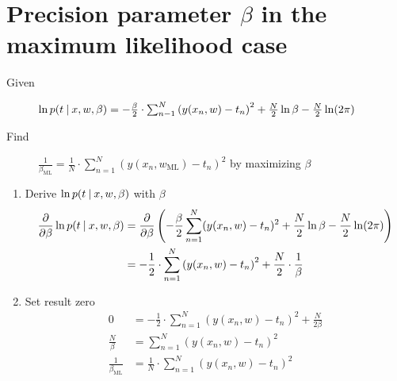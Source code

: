 \documentclass[a4paper]{article}
\newcommand\given{
  \nonscript\:
  \vert
  \nonscript\:
  \mathopen{}
  \allowbreak
}
\begin{document}
\section{Precision parameter $\beta$ in the maximum likelihood case}

\begin{description}
  \item[Given] $\ln{p(t \given x,w,\beta)} = -\frac{\beta}{2} \cdot \sum_{n-1}^N \left(y(x_n,w) - t_n\right)^2 + \frac{N}2 \ln{\beta} - \frac{N}{2} \ln(2\pi)$
  \item[Find] $\frac{1}{\beta_{\text{ML}}} = \frac{1}{N} \cdot \sum_{n=1}^N (y(x_n, w_{\text{ML}}) - t_n)^2$ by maximizing $\beta$
\end{description}

\begin{enumerate}
  \item Derive $\ln{p(t \given x,w,\beta)}$ with $\beta$
    \begin{align*}
      \frac{\partial}{\partial \beta} \ln{p(t \given x,w,\beta)}
      &= \frac{\partial}{\partial \beta} \left(-\frac{\beta}{2} \sum_{n=1}^N (y(x_n,w) - t_n)^2 + \frac{N}{2} \ln\beta - \frac{N}{2} \ln(2\pi)\right) \\
      &= -\frac12 \cdot \sum_{n=1}^N \left(y(x_n,w) - t_n\right)^2 + \frac{N}{2} \cdot \frac1\beta
    \end{align*}
  \item Set result zero
    \begin{align*}
      0 &= -\frac{1}{2} \cdot \sum_{n=1}^N \left(y(x_n,w) - t_n\right)^2 + \frac{N}{2\beta} \\
      \frac{N}{\beta} &= \sum_{n=1}^N \left(y(x_n,w) - t_n\right)^2 \\
      \frac{1}{\beta_{\text{ML}}} &= \frac{1}{N} \cdot \sum_{n=1}^N (y(x_n,w) - t_n)^2
    \end{align*}
\end{enumerate}
\end{document}
